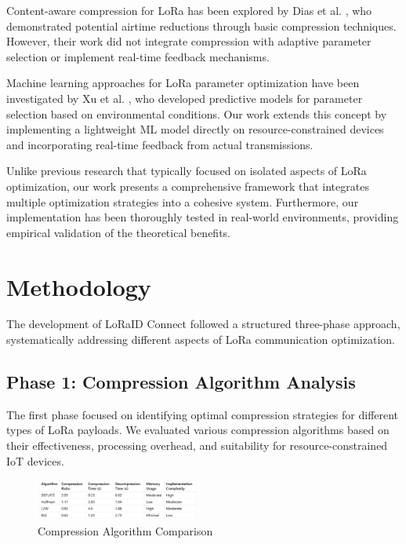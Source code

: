 \documentclass[conference]{IEEEtran}
\begin{document}
Content-aware compression for LoRa has been explored by Dias et al. \cite{dias2020compression}, who demonstrated potential airtime reductions through basic compression techniques. However, their work did not integrate compression with adaptive parameter selection or implement real-time feedback mechanisms.

Machine learning approaches for LoRa parameter optimization have been investigated by Xu et al. \cite{xu2019machine}, who developed predictive models for parameter selection based on environmental conditions. Our work extends this concept by implementing a lightweight ML model directly on resource-constrained devices and incorporating real-time feedback from actual transmissions.

Unlike previous research that typically focused on isolated aspects of LoRa optimization, our work presents a comprehensive framework that integrates multiple optimization strategies into a cohesive system. Furthermore, our implementation has been thoroughly tested in real-world environments, providing empirical validation of the theoretical benefits.

\section{Methodology}
The development of LoRaID Connect followed a structured three-phase approach, systematically addressing different aspects of LoRa communication optimization.

\subsection{Phase 1: Compression Algorithm Analysis}
The first phase focused on identifying optimal compression strategies for different types of LoRa payloads. We evaluated various compression algorithms based on their effectiveness, processing overhead, and suitability for resource-constrained IoT devices.

\begin{figure}[htbp]
\centering
\includegraphics[width=0.48\textwidth]{images/compression-algorithm-comparison.png}
\caption{Compression Algorithm Comparison}
\label{fig:compression_comparison}
\end{figure}
\end{document}
